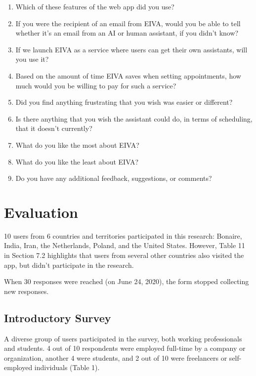 \documentclass{article}
\begin{document}
\begin{enumerate}
	\item Which of these features of the web app did you use?
	\item If you were the recipient of an email from EIVA, would you be able to tell whether it's an email from an AI or human assistant, if you didn't know?
	\item If we launch EIVA as a service where users can get their own assistants, will you use it?
	\item Based on the amount of time EIVA saves when setting appointments, how much would you be willing to pay for such a service?
	\item Did you find anything frustrating that you wish was easier or different?
	\item Is there anything that you wish the assistant could do, in terms of scheduling, that it doesn't currently?
	\item What do you like the most about EIVA?
	\item What do you like the least about EIVA?
	\item Do you have any additional feedback, suggestions, or comments?
\end{enumerate}

\newpage

\section{Evaluation}

10 users from 6 countries and territories participated in this research: Bonaire, India, Iran, the Netherlands, Poland, and the United States. However, Table 11 in Section 7.2 highlights that users from several other countries also visited the app, but didn't participate in the research.

When 30 responses were reached (on June 24, 2020), the form stopped collecting new responses.

\subsection{Introductory Survey}

A diverse group of users participated in the survey, both working professionals and students. 4 out of 10 respondents were employed full-time by a company or organization, another 4 were students, and 2 out of 10 were freelancers or self-employed individuals (Table 1).
\end{document}

